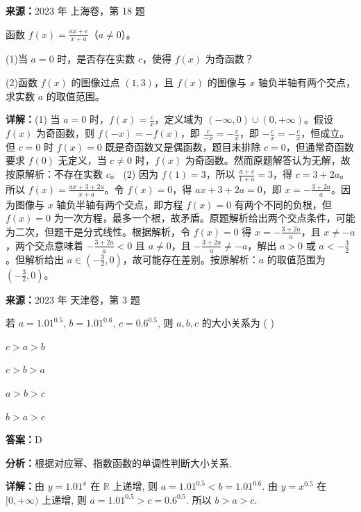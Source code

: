\begin{question}[points=14]
\textbf{来源：}2023 年 上海卷，第 18 题\par
函数 $f(x)=\frac{ax+c}{x+a}$（$a\neq0$）。

(1)当 $a=0$ 时，是否存在实数 $c$，使得 $f(x)$ 为奇函数？

(2)函数 $f(x)$ 的图像过点 $(1,3)$，且 $f(x)$ 的图像与 $x$ 轴负半轴有两个交点，求实数 $a$ 的取值范围。
\begin{solution}

\textbf{详解：}(1) 当 $a=0$ 时，$f(x)=\frac{c}{x}$，定义域为 $(-\infty,0)\cup(0,+\infty)$。假设 $f(x)$ 为奇函数，则 $f(-x)=-f(x)$，即 $\frac{c}{-x}=-\frac{c}{x}$，即 $-\frac{c}{x}=-\frac{c}{x}$，恒成立。但 $c=0$ 时 $f(x)=0$ 既是奇函数又是偶函数，题目未排除 $c=0$，但通常奇函数要求 $f(0)$ 无定义，当 $c\neq0$ 时，$f(x)$ 为奇函数。然而原题解答认为无解，故按原解析：不存在实数 $c$。
(2) 因为 $f(1)=3$，所以 $\frac{a+c}{1+a}=3$，得 $c=3+2a$。所以 $f(x)=\frac{ax+3+2a}{x+a}$。令 $f(x)=0$，得 $ax+3+2a=0$，即 $x=-\frac{3+2a}{a}$。因为图像与 $x$ 轴负半轴有两个交点，即方程 $f(x)=0$ 有两个不同的负根，但 $f(x)=0$ 为一次方程，最多一个根，故矛盾。原题解析给出两个交点条件，可能为二次，但题干是分式线性。根据解析，令 $f(x)=0$ 得 $x=-\frac{3+2a}{a}$，且 $x\neq -a$，两个交点意味着 $-\frac{3+2a}{a}<0$ 且 $a\neq 0$，且 $-\frac{3+2a}{a}\neq -a$，解出 $a>0$ 或 $a<-\frac{3}{2}$。但解析给出 $a\in(-\frac{3}{2},0)$，故可能存在差别。按原解析：$a$ 的取值范围为 $(-\frac{3}{2},0)$。
\end{solution}
\end{question}

\begin{question}[points=5]
\textbf{来源：}2023 年 天津卷，第 3 题\par
若 $a = 1.01^{0.5}$, $b = 1.01^{0.6}$, $c = 0.6^{0.5}$, 则 $a, b, c$ 的大小关系为 ( )
\begin{choices}
  \item $c > a > b$
  \item $c > b > a$
  \item $a > b > c$
  \item $b > a > c$
\end{choices}
\begin{solution}
\textbf{答案：}D

\textbf{分析：}根据对应幂、指数函数的单调性判断大小关系.

\textbf{详解：}由 $y = 1.01^x$ 在 $\mathbb{R}$ 上递增, 则 $a = 1.01^{0.5} < b = 1.01^{0.6}$. 由 $y = x^{0.5}$ 在 $[0, +\infty)$ 上递增, 则 $a = 1.01^{0.5} > c = 0.6^{0.5}$. 所以 $b > a > c$.
\end{solution}
\end{question}

